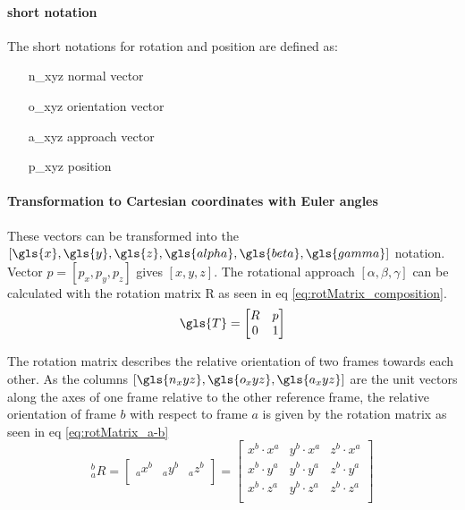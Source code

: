 \paragraph{short notation}
The short notations for rotation and position are defined as:

\begin{itemize}
	\item[\gls{n_xyz}] normal vector
	\item[\gls{o_xyz}] orientation vector
	\item[\gls{a_xyz}] approach vector
	\item[\gls{p_xyz}] position
\end{itemize}


\paragraph{Transformation to Cartesian coordinates with Euler angles }
These vectors can be transformed into the $[\gls{x},\gls{y},\gls{z},\gls{alpha},\gls{beta},\gls{gamma}]$ notation.
Vector $p = [p_x, p_y, p_z] $ gives $[x,y,z]$.
The rotational approach $[\alpha, \beta, \gamma]$ can be calculated with the rotation matrix \gls{R} as seen in eq \ref{eq:rotMatrix_composition}.
\begin{equation}\label{eq:rotMatrix_composition}
\gls{T} = 
\begin{bmatrix}
R & p \\
0 & 1 \\
\end{bmatrix}
\end{equation}

The rotation matrix describes the relative orientation of two frames towards each other. As the columns $[\gls{n_xyz},\gls{o_xyz},\gls{a_xyz}]$ are the unit vectors along the axes of one frame relative to the other reference frame, the relative orientation of frame ${b}$ with respect to frame ${a}$ is given by the rotation matrix as seen in eq \ref{eq:rotMatrix_a-b} \cite{ConstantinForwardKA}
\begin{equation}\label{eq:rotMatrix_a-b}
\phantom{}^b_aR =
\begin{bmatrix}
\phantom{}_ax^b & \phantom{}_ay^b & \phantom{}_az^b \\
\end{bmatrix}
=
\begin{bmatrix}
x^b \cdot x^a & y^b \cdot x^a & z^b \cdot x^a \\
x^b \cdot y^a & y^b \cdot y^a & z^b \cdot y^a \\
x^b \cdot z^a & y^b \cdot z^a & z^b \cdot z^a \\
\end{bmatrix}
\end{equation}

